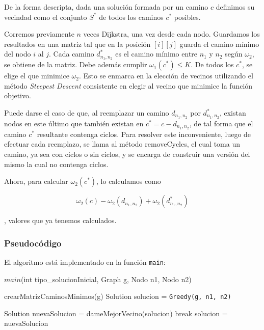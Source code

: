 De la forma descripta, dada una solución formada por un camino $c$ definimos su vecindad como el conjunto $S^*$ de todos los caminos $c^*$ posibles.

Corremos previamente $n$ veces Dijkstra, una vez desde cada nodo. Guardamos los resultados en una matriz tal que en la posición $[i][j]$ guarda el camino mínimo del nodo $i$ al $j$. Cada camino $d_{n_1,n_2}^*$ es el camino mínimo entre $n_1$ y $n_2$ según $\omega_2$, se obtiene de la matriz. Debe además cumplir $\omega_1(c^*) \leq K$. De todos los $c^*$, se elige el que minimice $\omega_2$. Esto se enmarca en la elección de vecinos utilizando el método \textit{Steepest Descent} consistente en elegir al vecino que minimice la función objetivo.

Puede darse el caso de que, al reemplazar un camino $d_{n_1,n_2}$ por $d_{n_1,n_2}^*$, existan nodos en este último que también existan en $c^* = c - d_{n_1,n_2}$, de tal forma que el camino $c^*$ resultante contenga ciclos. Para resolver este inconveniente, luego de efectuar cada reemplazo, se llama al método removeCycles, el cual toma un camino, ya sea con ciclos o sin ciclos, y se encarga de construir una versión del mismo la cual no contenga ciclos.

Ahora, para calcular $\omega_2(c^*)$, lo calculamos como

\[
\omega_2(c) - \omega_2(d_{n_1,n_2}) + \omega_2(d_{n_1,n_2}^*)
\]

, valores que ya tenemos calculados.

\subsubsection{Pseudocódigo}

El algoritmo está implementado en la función \texttt{main}:

\begin{algorithm}[H]
\caption{$main$(int tipo\_solucionInicial, Graph g, Nodo n1, Nodo n2)}
\begin{algorithmic}[1]
  \State crearMatrizCaminosMinimos(g)
  \State Solution solucion = \texttt{Greedy(g, n1, n2)}
  
    	\State Solution nuevaSolucion = dameMejorVecino(solucion)
		\State break	
	\EndIf    
	\State solucion = nuevaSolucion	
    \EndWhile
  \EndIf
\end{algorithmic}
\end{algorithm}

